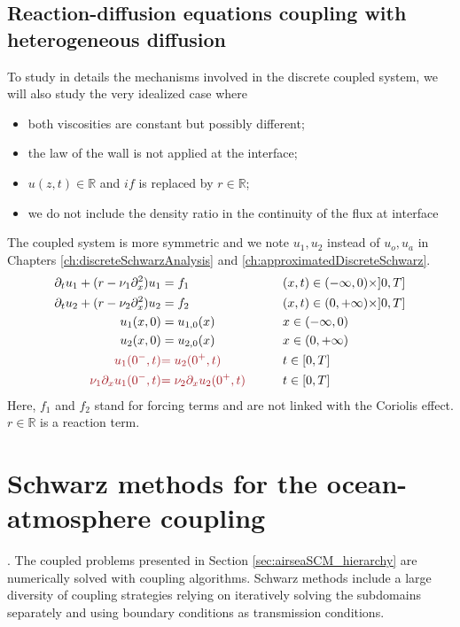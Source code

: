 \subsection{Reaction-diffusion equations coupling
with heterogeneous diffusion}
\label{sec:airseaSCM_reactionDiffusionSection}
To study in details the mechanisms involved in
the discrete coupled system, we will also study the very idealized
case where
\begin{itemize}
	\item both viscosities are constant but possibly different;
	\item the law of the wall is not applied
		at the interface;
	\item $u(z,t) \in\mathbb{R}$ and $if$ is replaced by
		$r\in\mathbb{R}$;
	\item we do not include the density ratio
	in the continuity of the flux at interface
\end{itemize}
The coupled system is more symmetric and we note
$u_1, u_2$ instead of $u_o, u_a$ in Chapters
\ref{ch:discreteSchwarzAnalysis} and
\ref{ch:approximatedDiscreteSchwarz}.
\begin{subequations}
\begin{align}
\partial_t u_1 +( r - \nu_1 \partial_x^2) u_1 &= f_1  &\qquad& (x,t) \in (-\infty,0) \times ]0,T] \label{eq:airseaSCM_dr1} \\
\partial_t u_2 + ( r - \nu_2 \partial_x^2) u_2  &= f_2  &\qquad& (x,t) \in (0,+\infty) \times ]0,T] \label{eq:airseaSCM_dr2}\\
	u_1(x,0) &= u_{1,0}(x)   &\qquad&  x \in (-\infty,0)
	\label{eq:airseaSCM_initialCond1} \\
u_2(x,0) &= u_{2,0}(x)   &\qquad&  x \in (0,+\infty)
	\label{eq:airseaSCM_initialCond2} \\
	\emphase{u_1(0^-,t)} &\emphase{=  u_2(0^+,t)}
	&\qquad& t \in [0,T] \label{eq:airseaSCM_interface-dir} \\
	\emphase{\nu_1 \partial_x u_1(0^-,t)} &
	\emphase{= \nu_2 \partial_x u_2(0^+,t)} &\qquad& t \in [0,T] \label{eq:airseaSCM_interface-neu} 
\end{align}
\label{eq:model-problem}
\end{subequations}
Here, $f_1$ and $f_2$
stand for forcing terms and are not linked with the Coriolis effect.
$r\in \mathbb{R}$ is a reaction term.
%
\section{Schwarz methods for the ocean-atmosphere coupling}
\label{sec:airseaSCM_Schwarz}.
The coupled problems presented in Section
\ref{sec:airseaSCM_hierarchy} are numerically solved with
coupling algorithms.
Schwarz methods include a large diversity of coupling
strategies relying on iteratively solving
the subdomains separately and using boundary
conditions as transmission conditions.
